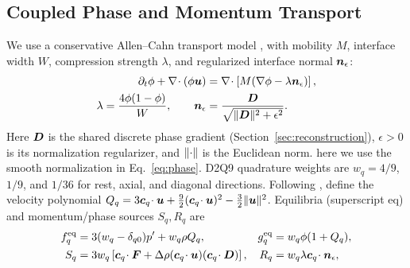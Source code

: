 \subsection{Coupled Phase and Momentum Transport}
\label{sec:flow}
We use a conservative Allen--Cahn transport model
\citep{Geier2015}, with mobility $M$, interface width $W$, compression
strength $\lambda$, and regularized interface normal $\boldsymbol{n}_\epsilon$:
\begin{equation}
      \begin{aligned}
            \partial_t\phi+\nabla\!\cdot(\phi\boldsymbol{u})
                             & =\nabla\!\cdot\left[M(\nabla\phi-\lambda\boldsymbol{n}_\epsilon)\right], \\
            \lambda=\frac{4\phi(1-\phi)}{W},\qquad
            \boldsymbol{n}_\epsilon & =\frac{\boldsymbol{D}}{\sqrt{\lVert\boldsymbol{D}\rVert^2+\epsilon^2}}.
      \end{aligned}
      \label{eq:phase}
\end{equation}
Here $\boldsymbol{D}$ is the shared discrete phase gradient
(Section~\ref{sec:reconstruction}), $\epsilon>0$ is its normalization
regularizer, and $\lVert\cdot\rVert$ is the Euclidean norm.
  here we use the smooth normalization in
Eq.~\eqref{eq:phase}. D2Q9 quadrature weights are
$w_q=4/9$, $1/9$, and $1/36$ for rest, axial, and diagonal directions.
Following \citet{Liang2018}, define the velocity polynomial
$Q_q=3\boldsymbol{c}_q\!\cdot\boldsymbol{u}+
      \tfrac92(\boldsymbol{c}_q\!\cdot\boldsymbol{u})^2-\tfrac32\lVert\boldsymbol{u}\rVert^2$.
Equilibria (superscript $\mathrm{eq}$) and momentum/phase sources $S_q,R_q$ are
\begin{equation}
      \begin{aligned}
            f_q^{\mathrm{eq}} & =3(w_q-\delta_{q0})p'+w_q\rho Q_q,
                              & g_q^{\mathrm{eq}}                          & =w_q\phi(1+Q_q),                              \\
            S_q               & =3w_q\left[\boldsymbol{c}_q\!\cdot\boldsymbol{F}
                                           +\Delta\rho(\boldsymbol{c}_q\!\cdot\boldsymbol{u})
                                           (\boldsymbol{c}_q\!\cdot\boldsymbol{D})\right],
                              & R_q                                        & =w_q\lambda\boldsymbol{c}_q\!\cdot\boldsymbol{n}_\epsilon ,
      \end{aligned}
      \label{eq:equilibria}
\end{equation}
